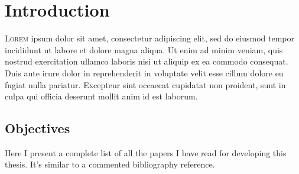 \chapter{Introduction}



\lettrine{L}{orem} ipsum dolor sit amet, consectetur
adipiscing elit, sed do eiusmod tempor incididunt ut labore et dolore magna
aliqua. Ut enim ad minim veniam, quis nostrud exercitation ullamco laboris nisi
ut aliquip ex ea commodo consequat. Duis aute irure dolor in reprehenderit in
voluptate velit esse cillum dolore eu fugiat nulla pariatur. Excepteur sint
occaecat cupidatat non proident, sunt in culpa qui officia deserunt mollit anim
id est laborum.


\section{Objectives}


Here I present a complete list of all the papers I have read for developing this
thesis. It's similar to a commented bibliography reference.